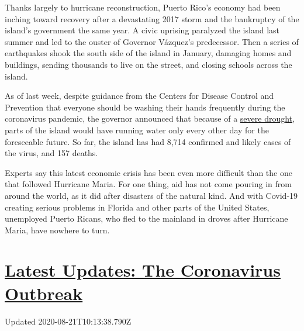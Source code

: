 Thanks largely to hurricane reconstruction, Puerto Rico's economy had
been inching toward recovery after a devastating 2017 storm and the
bankruptcy of the island's government the same year. A civic uprising
paralyzed the island last summer and led to the ouster of Governor
Vázquez's predecessor. Then a series of earthquakes shook the south side
of the island in January, damaging homes and buildings, sending
thousands to live on the street, and closing schools across the island.

As of last week, despite guidance from the Centers for Disease Control
and Prevention that everyone should be washing their hands frequently
during the coronavirus pandemic, the governor announced that because of
a
\href{https://apnews.com/485aa49fc349decdbbef5e663d92dc74\#:~:text=SAN\%20JUAN\%2C\%20Puerto\%20Rico\%20(AP,territory\%20amid\%20a\%20coronavirus\%20pandemic.\&text=Gov.\%20Wanda\%20V\%C3\%A1zquez\%20said\%2021,29\%20by\%20the\%20moderate\%20drought.}{severe
drought}, parts of the island would have running water only every other
day for the foreseeable future. So far, the island has had 8,714
confirmed and likely cases of the virus, and 157 deaths.

Experts say this latest economic crisis has been even more difficult
than the one that followed Hurricane Maria. For one thing, aid has not
come pouring in from around the world, as it did after disasters of the
natural kind. And with Covid-19 creating serious problems in Florida and
other parts of the United States, unemployed Puerto Ricans, who fled to
the mainland in droves after Hurricane Maria, have nowhere to turn.

\hypertarget{latest-updates-the-coronavirus-outbreak}{%
\section{\texorpdfstring{\href{https://www.nytimes3xbfgragh.onion/2020/08/21/world/covid-19-coronavirus.html?action=click\&pgtype=Article\&state=default\&region=MAIN_CONTENT_1\&context=storylines_live_updates}{Latest
Updates: The Coronavirus
Outbreak}}{Latest Updates: The Coronavirus Outbreak}}\label{latest-updates-the-coronavirus-outbreak}}

Updated 2020-08-21T10:13:38.790Z

